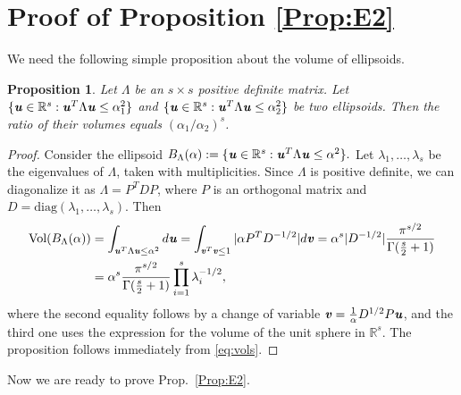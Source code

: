 \documentclass[11pt,onecolumn]{IEEEtran}
\newtheorem{proposition}[theorem]{Proposition}
\def\mathbi#1{{\textbf{\textit #1}}}
\begin{document}
\section{Proof of Proposition \ref{Prop:E2}}\label{ap:E2}
We need the following simple proposition about the volume of ellipsoids.
\begin{proposition}\label{Prop:ellips}
Let $\Lambda$ be an $s\times s$ positive definite matrix. Let 
$
\{\mathbi{u} \in \mathbb{R}^s: \mathbi{u}^T \Lambda \mathbi{u} \le \alpha_1^2\}
$
and
$
\{\mathbi{u} \in \mathbb{R}^s: \mathbi{u}^T \Lambda \mathbi{u} \le \alpha_2^2\}
$
be two ellipsoids. Then the ratio of their volumes equals $(\alpha_1 / \alpha_2)^s$.
\end{proposition}
\begin{proof} Consider the ellipsoid $
B_{\Lambda}(\alpha):=\{\mathbi{u} \in \mathbb{R}^s: \mathbi{u}^T \Lambda \mathbi{u} \le \alpha^2\}.
$
Let $\lambda_1,\dots,\lambda_s$ be the eigenvalues of $\Lambda$, taken with multiplicities.
Since $\Lambda$ is positive definite, we can diagonalize it as 
$\Lambda=P^T DP$, where $P$ is an orthogonal matrix and $D=\text{diag}(\lambda_1,\dots,\lambda_s)$.
Then
\begin{align}
\text{Vol}(B_{\Lambda}(\alpha))&=\int_{\mathbi{u}^T \Lambda \mathbi{u} \le \alpha^2} d\mathbi{u} 
= \int_{\mathbi{v}^T \mathbi{v} \le 1} |\alpha P^T D^{-1/2}| d\mathbi{v} 
= \alpha^s |D^{-1/2}| \frac{\pi^{s/2}}{\Gamma(\frac{s}{2}+1)} \nonumber\\
&= \alpha^s \frac{\pi^{s/2}}{\Gamma(\frac{s}{2}+1)} \prod_{i=1}^s \lambda_i^{-1/2},
\label{eq:vols}
\end{align}
where the second equality follows by a change of variable $\mathbi{v}=\frac{1}{\alpha}D^{1/2}P\mathbi{u}$, and the third one 
uses the expression for the volume of the unit sphere in $\mathbb{R}^s.$
The proposition follows immediately from \eqref{eq:vols}.
\end{proof}
Now we are ready to prove Prop.~\ref{Prop:E2}.
\end{document}
